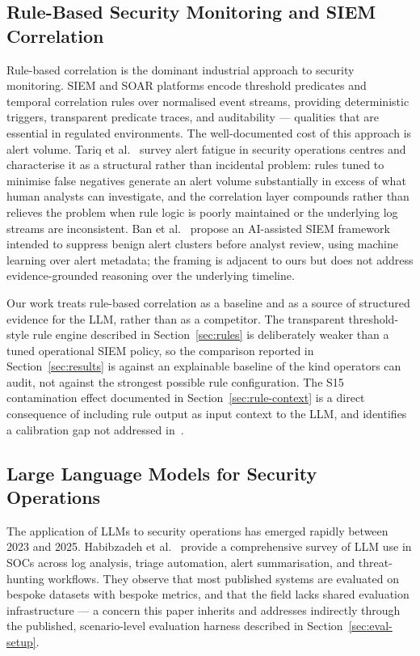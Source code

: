 \documentclass[conference]{IEEEtran}
\begin{document}
\subsection{Rule-Based Security Monitoring and SIEM Correlation}

Rule-based correlation is the dominant industrial approach to security monitoring. SIEM and SOAR platforms encode threshold predicates and temporal correlation rules over normalised event streams, providing deterministic triggers, transparent predicate traces, and auditability --- qualities that are essential in regulated environments. The well-documented cost of this approach is alert volume. Tariq et al.~\cite{ref1} survey alert fatigue in security operations centres and characterise it as a structural rather than incidental problem: rules tuned to minimise false negatives generate an alert volume substantially in excess of what human analysts can investigate, and the correlation layer compounds rather than relieves the problem when rule logic is poorly maintained or the underlying log streams are inconsistent. Ban et al.~\cite{ref2} propose an AI-assisted SIEM framework intended to suppress benign alert clusters before analyst review, using machine learning over alert metadata; the framing is adjacent to ours but does not address evidence-grounded reasoning over the underlying timeline.

Our work treats rule-based correlation as a baseline and as a source of structured evidence for the LLM, rather than as a competitor. The transparent threshold-style rule engine described in Section~\ref{sec:rules} is deliberately weaker than a tuned operational SIEM policy, so the comparison reported in Section~\ref{sec:results} is against an explainable baseline of the kind operators can audit, not against the strongest possible rule configuration. The S15 contamination effect documented in Section~\ref{sec:rule-context} is a direct consequence of including rule output as input context to the LLM, and identifies a calibration gap not addressed in~\cite{ref2}.

\subsection{Large Language Models for Security Operations}

The application of LLMs to security operations has emerged rapidly between 2023 and 2025. Habibzadeh et al.~\cite{ref3} provide a comprehensive survey of LLM use in SOCs across log analysis, triage automation, alert summarisation, and threat-hunting workflows. They observe that most published systems are evaluated on bespoke datasets with bespoke metrics, and that the field lacks shared evaluation infrastructure --- a concern this paper inherits and addresses indirectly through the published, scenario-level evaluation harness described in Section~\ref{sec:eval-setup}.
\end{document}
